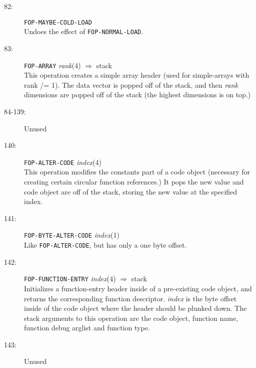 \begin{description}
\item[82:] \hspace{2em} {\tt FOP-MAYBE-COLD-LOAD}\\
Undoes the effect of {\tt FOP-NORMAL-LOAD}. 

\item[83:] \hspace{2em} {\tt FOP-ARRAY} \hspace{2em} {\it rank}(4)
\hspace{2em} $\Rightarrow$ \hspace{2em} stack\\
This operation creates a simple array header (used for simple-arrays with rank
/= 1).  The data vector is popped off of the stack, and then {\it rank}
dimensions are popped off of the stack (the highest dimensions is on top.)

\item[84-139:] Unused

\item[140:] \hspace{2em} {\tt FOP-ALTER-CODE} \hspace{2em} {\it index}(4)\\
This operation modifies the constants part of a code object (necessary for
creating certain circular function references.)  It pops the new value and code
object are off of the stack, storing the new value at the specified index.

\item[141:] \hspace{2em} {\tt FOP-BYTE-ALTER-CODE} \hspace{2em} {\it index}(1)\\
Like {\tt FOP-ALTER-CODE}, but has only a one byte offset.

\item[142:] \hspace{2em} {\tt FOP-FUNCTION-ENTRY} \hspace{2em} {\it index}(4)
\hspace{2em} $\Rightarrow$ \hspace{2em} stack\\
Initializes a function-entry header inside of a pre-existing code object, and
returns the corresponding function descriptor.  {\it index} is the byte offset
inside of the code object where the header should be plunked down.  The stack
arguments to this operation are the code object, function name, function debug
arglist and function type.

\item[143:] Unused


\end{description}

